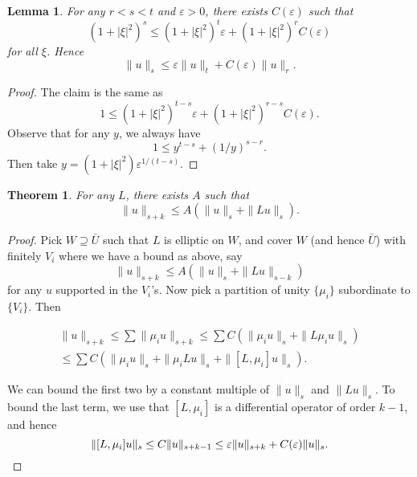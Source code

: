 \documentclass{shortart}
\newtheorem*{thm}{Theorem}
\newtheorem*{lemma}{Lemma}
\theoremstyle{definition}
\begin{document}
\begin{lemma}
  For any $r < s < t$ and $\varepsilon > 0$, there exists $C(\varepsilon)$ such that
  \[
    (1 + |\xi|^2)^s \leq (1 + |\xi|^2)^t \varepsilon + (1 + |\xi|^2)^r C(\varepsilon)
  \]
  for all $\xi$. Hence
  \[
    \|u\|_s \leq \varepsilon \|u\|_t + C(\varepsilon) \|u\|_r.
  \]
\end{lemma}

\begin{proof}
  The claim is the same as
  \[
    1 \leq (1 + |\xi|^2)^{t - s} \varepsilon + (1 + |\xi|^2)^{r - s} C(\varepsilon).
  \]
  Observe that for any $y$, we always have
  \[
    1 \leq y^{t - s} + (1/y)^{s - r}.
  \]
  Then take $y = (1 + |\xi|^2) \varepsilon^{1/(t - s)}$.
\end{proof}

\begin{thm}
  For any $L$, there exists $A$ such that
  \[
    \|u\|_{s + k} \leq A (\|u\|_s + \|Lu\|_s).
  \]
\end{thm}

\begin{proof}
  Pick $W \supseteq \bar{U}$ such that $L$ is elliptic on $W$, and cover $W$ (and hence $\bar{U}$) with finitely $V_i$ where we have a bound as above, say
  \[
    \|u\|_{s + k} \leq A (\|u\|_s + \|Lu\|_{s - k})
  \]
  for any $u$ supported in the $V_i$'s. Now pick a partition of unity $\{\mu_i\}$ subordinate to $\{V_i\}$. Then
  \begin{useimager}
    \begin{multline*}
      \|u\|_{s + k} \leq \sum \|\mu_i u\|_{s + k} \leq \sum C(\|\mu_i u\|_s + \|L \mu_i u\|_s)\\
      \leq \sum C(\|\mu_i u\|_s + \|\mu_i Lu\|_s + \|[L, \mu_i] u\|_s).
    \end{multline*}
  \end{useimager}
  We can bound the first two by a constant multiple of $\|u\|_s$ and $\|Lu\|_s$. To bound the last term, we use that $[L, \mu_i]$ is a differential operator of order $k - 1$, and hence
  \[
    \|[L, \mu_i] u\|_s \leq C \|u\|_{s + k - 1} \leq \varepsilon \|u\|_{s + k} + C(\varepsilon) \|u\|_s.\qedhere
  \]
\end{proof}
\end{document}
